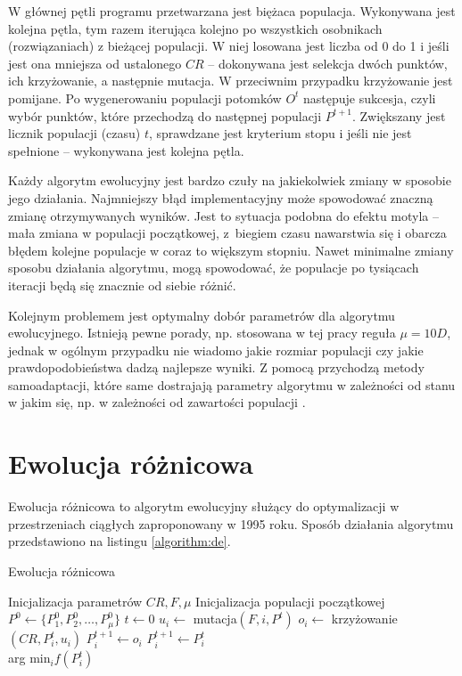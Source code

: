 \documentclass[a4paper,onecolumn,oneside,12pt,wide,floatssmall]{mwrep}
\theoremstyle{definition}
\theoremstyle{plain}%
\theoremstyle{remark}
\begin{document}
W głównej pętli programu przetwarzana jest biężaca populacja. 
Wykonywana jest kolejna pętla, tym razem iterująca kolejno po wszystkich osobnikach 
(rozwiązaniach) z bieżącej populacji. W niej losowana jest liczba od 0 do 1 i jeśli jest ona mniejsza
od ustalonego $CR$ -- dokonywana jest selekcja dwóch punktów, ich krzyżowanie, a następnie mutacja.
W przeciwnim przypadku krzyżowanie jest pomijane.
Po wygenerowaniu populacji potomków $O^t$ następuje sukcesja, czyli wybór punktów, które przechodzą
do następnej populacji $P^{t+1}$. Zwiększany jest licznik populacji (czasu) $t$,
sprawdzane jest kryterium stopu i jeśli nie jest spełnione --
wykonywana jest kolejna pętla.
 
Każdy algorytm ewolucyjny jest bardzo czuły na jakiekolwiek zmiany w sposobie jego działania. 
Najmniejszy błąd implementacyjny może spowodować znaczną zmianę otrzymywanych wyników. 
Jest to sytuacja podobna do efektu motyla -- mała zmiana w populacji początkowej, 
z biegiem czasu nawarstwia się i obarcza błędem kolejne populacje w coraz to większym stopniu. 
Nawet minimalne zmiany sposobu działania algorytmu, mogą spowodować, że populacje po tysiącach iteracji 
będą się znacznie od siebie różnić.

Kolejnym problemem jest optymalny dobór parametrów dla algorytmu ewolucyjnego. 
Istnieją pewne porady, np. stosowana w tej pracy reguła $\mu = 10D$, 
jednak w ogólnym przypadku nie wiadomo jakie rozmiar populacji czy jakie prawdopodobieństwa dadzą
najlepsze wyniki. Z pomocą przychodzą
metody samoadaptacji, które same dostrajają parametry algorytmu w zależności od stanu w jakim się,
np. w zależności od zawartości populacji \cite{brest}.

\chapter{Ewolucja różnicowa}

Ewolucja różnicowa to algorytm ewolucyjny służący do optymalizacji
w przestrzeniach ciągłych zaproponowany w 1995 roku. \cite{storn} Sposób działania algorytmu
przedstawiono na listingu \ref{algorithm:de}.

\begin{algorithm}[!htb]
\caption{Ewolucja różnicowa}
\label{algorithm:de}
\begin{algorithmic}[1]
\State Inicjalizacja parametrów $CR, F, \mu$
\State Inicjalizacja populacji początkowej $P^0 \gets \{P^0_1, P^0_2, \ldots, P^0_\mu\}$
\State $t \gets 0$
    \State $u_i \gets$ mutacja$(F, i, P^t)$
    \State $o_i \gets$ krzy{\.z}owanie$(CR, P_i^t, u_i)$
      \State $P_i^{t+1} \gets o_i$     
    \Else
      \State $P_i^{t+1} \gets P_i^{t}$
    \EndIf
  \EndFor
\EndWhile \\
\Return arg min$_i f(P^t_i)$
\end{algorithmic}
\end{algorithm}
\end{document}
